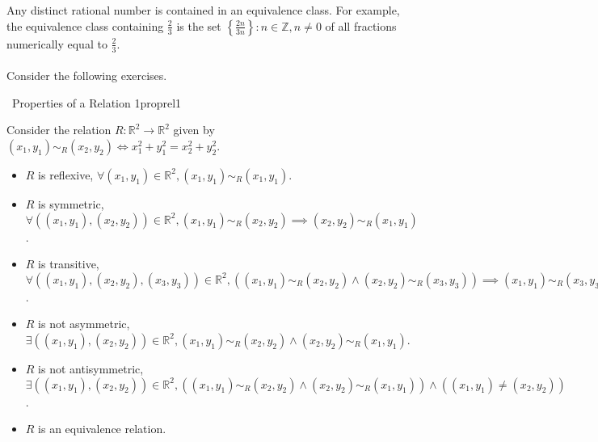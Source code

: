         \vphantom
        \\
        \\
        Any distinct rational number is contained in an equivalence class. For example, the equivalence class containing \(\frac{2}{3}\) is the set \(\left\{\frac{2n}{3n}\right\}:n\in\mathbb{Z},n\neq0\) of all fractions numerically equal to \(\frac{2}{3}\).
        \\
        \\
        Consider the following exercises.
        \begin{exercise}{\Difficulty\,\Difficulty\,\,Properties of a Relation 1}{proprel1}
        
            Consider the relation \(R:\mathbb{R}^2\to\mathbb{R}^2\) given by \((x_1,y_1)\sim_R(x_2,y_2)\iff x_1^2+y_1^2=x_2^2+y_2^2\).
            \begin{itemize}
                \item \(R\) is reflexive, \(\forall (x_1,y_1)\in\mathbb{R}^2, (x_1,y_1)\sim_R(x_1,y_1)\).
                \item \(R\) is symmetric, \(\forall ((x_1,y_1), (x_2,y_2))\in\mathbb{R}^2, (x_1,y_1)\sim_R(x_2,y_2)\implies (x_2,y_2)\sim_R(x_1,y_1)\).
                \item \(R\) is transitive, \(\forall ((x_1,y_1), (x_2,y_2), (x_3,y_3))\in\mathbb{R}^2, ((x_1,y_1)\sim_R(x_2,y_2)\wedge (x_2,y_2)\sim_R(x_3,y_3))\implies(x_1,y_1)\sim_R(x_3,y_3)\).
                \item \(R\) is not asymmetric, \(\exists ((x_1,y_1), (x_2,y_2))\in\mathbb{R}^2,(x_1,y_1)\sim_R(x_2,y_2)\wedge(x_2,y_2)\sim_R(x_1,y_1)\).
                \item \(R\) is not antisymmetric, \(\exists ((x_1,y_1), (x_2,y_2))\in\mathbb{R}^2,((x_1,y_1)\sim_R(x_2,y_2)\wedge(x_2,y_2)\sim_R(x_1,y_1))\wedge((x_1,y_1)\neq(x_2,y_2))\).
                \item \(R\) is an equivalence relation.
            \end{itemize}
        
        \end{exercise}
        \pagebreak
